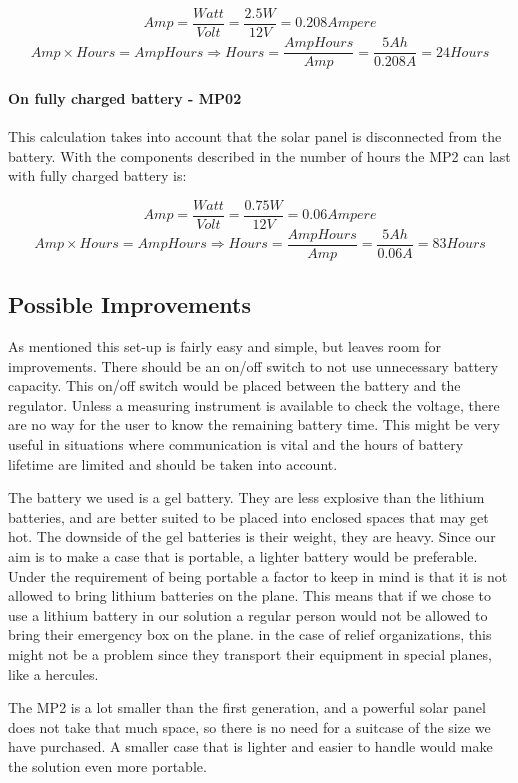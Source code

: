 $$Amp = \frac{Watt}{Volt} = \frac{2.5 W}{12 V} = 0.208 Ampere$$
$$Amp\times Hours = AmpHours \Rightarrow Hours = \frac{AmpHours}{Amp} = \frac{5 Ah}{0.208 A} = 24 Hours$$

\paragraph{On fully charged battery - MP02}
This calculation takes into account that the solar panel is disconnected from the battery. With the components described in  the number of hours the MP2 can last with fully charged battery is: 

$$Amp = \frac{Watt}{Volt} = \frac{0.75 W}{12 V} = 0.06 Ampere$$
$$Amp\times Hours = AmpHours \Rightarrow Hours = \frac{AmpHours}{Amp} = \frac{5 Ah}{0.06 A} = 83 Hours$$


\subsection{Possible Improvements}
As mentioned this set-up is fairly easy and simple, but leaves room for improvements. There should be an on/off switch to not use unnecessary battery capacity. This on/off switch would be placed between the battery and the regulator. Unless a measuring instrument is available to check the voltage, there are no way for the user to know the remaining battery time. This might be very useful in situations where communication is vital and the hours of battery lifetime are limited and should be taken into account. 

The battery we used is a gel battery. They are less explosive than the lithium batteries, and are better suited to be placed into enclosed spaces that may get hot. The downside of the gel batteries is their weight, they are heavy. Since our aim is to make a case that is portable, a lighter battery would be preferable. Under the requirement of being portable a factor to keep in mind is that it is not allowed to bring lithium batteries on the plane. This means that if we chose to use a lithium battery in our solution a regular person would not be allowed to bring their emergency box on the plane. in the case of relief organizations, this might not be a problem since they transport their equipment in special planes, like a hercules. 

The MP2 is a lot smaller than the first generation, and a powerful solar panel does not take that much space, so there is no need for a suitcase of the size we have purchased. A smaller case that is lighter and easier to handle would make the solution even more portable. 

